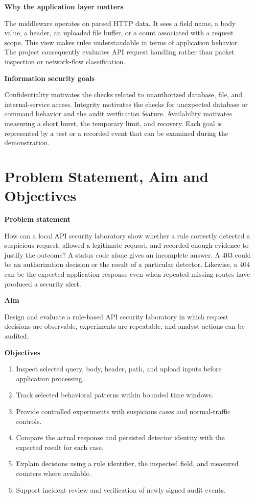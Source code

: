 \documentclass[11pt,letterpaper,oneside]{report}
\newcommand{\topic}[1]{\smallskip\noindent\textbf{#1}\par\nobreak\vspace{-.39em}}
\newcommand{\sheet}[1]{\clearpage\section{#1}}
\begin{document}
\topic{Why the application layer matters}
The middleware operates on parsed HTTP data. It sees a field name, a body value, a header, an uploaded file buffer, or a count associated with a request scope. This view makes rules understandable in terms of application behavior. The project consequently evaluates API request handling rather than packet inspection or network-flow classification.

\topic{Information security goals}
Confidentiality motivates the checks related to unauthorized database, file, and internal-service access. Integrity motivates the checks for unexpected database or command behavior and the audit verification feature. Availability motivates measuring a short burst, the temporary limit, and recovery. Each goal is represented by a test or a recorded event that can be examined during the demonstration.

\sheet{Problem Statement, Aim and Objectives}
\topic{Problem statement}
How can a local API security laboratory show whether a rule correctly detected a suspicious request, allowed a legitimate request, and recorded enough evidence to justify the outcome? A status code alone gives an incomplete answer. A 403 could be an authorization decision or the result of a particular detector. Likewise, a 404 can be the expected application response even when repeated missing routes have produced a security alert.

\topic{Aim}
Design and evaluate a rule-based API security laboratory in which request decisions are observable, experiments are repeatable, and analyst actions can be audited.

\topic{Objectives}
\begin{enumerate}
\item Inspect selected query, body, header, path, and upload inputs before application processing.
\item Track selected behavioral patterns within bounded time windows.
\item Provide controlled experiments with suspicious cases and normal-traffic controls.
\item Compare the actual response and persisted detector identity with the expected result for each case.
\item Explain decisions using a rule identifier, the inspected field, and measured counters where available.
\item Support incident review and verification of newly signed audit events.
\end{enumerate}
\end{document}
